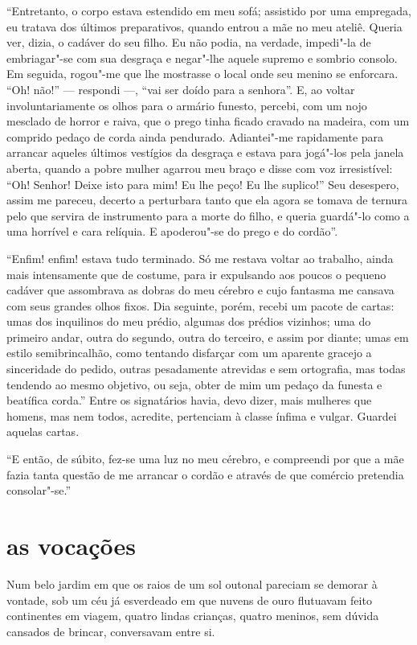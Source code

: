 “Entretanto, o corpo estava estendido em meu sofá; assistido 
por uma empregada, eu tratava dos últimos preparativos, quando
entrou a mãe no meu ateliê. Queria ver, dizia, o cadáver do seu
filho. Eu não podia, na verdade, impedi"-la de embriagar"-se com sua
desgraça e negar"-lhe aquele supremo e sombrio consolo. Em seguida,
rogou"-me que lhe mostrasse o local onde seu menino se
enforcara. “Oh! não!'' --- respondi ---, “vai ser doído
para a senhora''. E, ao voltar involuntariamente os olhos
para o armário funesto, percebi, com um nojo mesclado de horror e
raiva, que o prego tinha ficado cravado na madeira, com um comprido
pedaço de corda ainda pendurado. Adiantei"-me rapidamente para arrancar
aqueles últimos vestígios da desgraça e estava para jogá"-los 
pela janela aberta, quando a pobre mulher agarrou meu braço e disse com voz
irresistível: “Oh! Senhor! Deixe isto para mim! Eu lhe peço! Eu
lhe suplico!” Seu desespero, assim me pareceu, decerto a
perturbara tanto que ela agora se tomava de ternura pelo que 
servira de instrumento para a morte do filho, e queria guardá"-lo
como a uma horrível e cara relíquia. E apoderou"-se do prego e
do cordão''.

“Enfim! enfim! estava tudo terminado. Só me restava voltar
ao trabalho, ainda mais intensamente que de costume, para ir expulsando
aos poucos o pequeno cadáver que assombrava as dobras do meu cérebro
e cujo fantasma me cansava com seus grandes olhos fixos. Dia
seguinte, porém, recebi um pacote de cartas: umas dos inquilinos do meu prédio,
algumas dos prédios vizinhos; uma do primeiro andar, outra do
segundo, outra do terceiro, e assim por diante; umas em estilo
semibrincalhão, como tentando disfarçar com um aparente gracejo a
sinceridade do pedido, outras pesadamente atrevidas e sem ortografia,
mas todas tendendo ao mesmo objetivo, ou seja, obter de mim um pedaço
da funesta e beatífica corda.'' Entre os signatários havia, devo dizer, mais mulheres que homens,
mas nem todos, acredite, pertenciam à classe ínfima e vulgar.
Guardei aquelas cartas.

“E então, de súbito, fez-se uma luz no meu cérebro, e
compreendi por que a mãe fazia tanta questão de me arrancar o cordão e
através de que comércio pretendia consolar"-se.''

\quebra\section[As vocações]{as vocações}

Num belo jardim em que os raios de um sol outonal pareciam se demorar à
vontade, sob um céu já esverdeado em que nuvens de ouro flutuavam feito
continentes em viagem, quatro lindas crianças, quatro meninos, sem
dúvida cansados de brincar, conversavam entre si.

